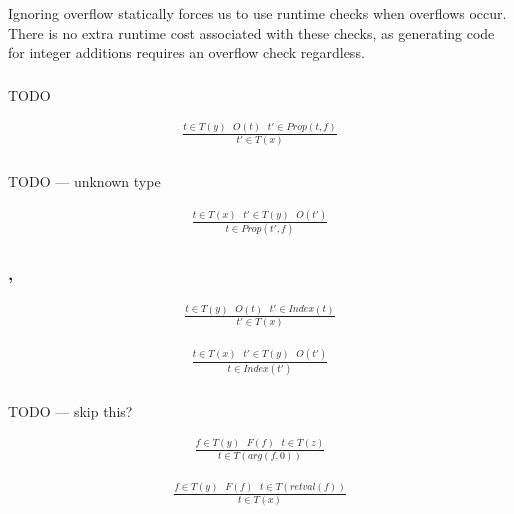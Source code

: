 Ignoring overflow statically forces us to use runtime checks when overflows
occur.
There is no extra runtime cost associated with these checks, as
generating code for integer additions requires an overflow check regardless.

\subsubsection{}

TODO

\begin{eqnarray*}
\frac{t \in T(y) ~~~ O(t) ~~~ t' \in Prop(t,f)}{t' \in T(x)}
\end{eqnarray*}

\subsubsection{}

TODO --- unknown type

\begin{eqnarray*}
\frac{t \in T(x) ~~~ t' \in T(y) ~~~ O(t')}{t \in Prop(t',f)}
\end{eqnarray*}

\subsubsection{, }

\begin{eqnarray*}
\frac{t \in T(y) ~~~ O(t) ~~~ t' \in Index(t)}{t' \in T(x)}
\end{eqnarray*}

\begin{eqnarray*}
\frac{t \in T(x) ~~~ t' \in T(y) ~~~ O(t')}{t \in Index(t')}
\end{eqnarray*}

\subsubsection{}

TODO --- skip this?

\begin{eqnarray*}
\frac{f \in T(y) ~~~ F(f) ~~~ t \in T(z)}{t \in T(arg(f, 0))}
\end{eqnarray*}

\begin{eqnarray*}
\frac{f \in T(y) ~~~ F(f) ~~~ t \in T(retval(f))}{t \in T(x)}
\end{eqnarray*}

